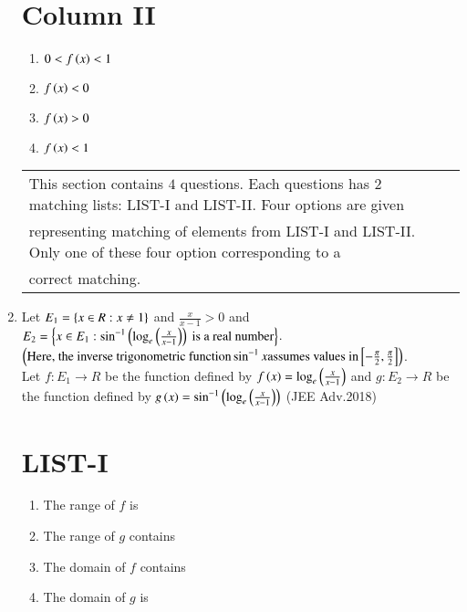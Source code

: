 \documentclass[journal,12pt,onecolumn,article]{IEEEtran}
\theoremstyle{remark}
\begin{document}
\begin{enumerate}
\begin{multicols}{2}
						\section*{ Column II}
						\begin{enumerate}[label=(\alph*) ,start=16]
							\item $0<f\left(x\right)<1$
							\item $f\left(x\right)<0$
							\item $f\left(x\right)>0$
							\item $f\left(x\right)<1$
						\end{enumerate}
					\end{multicols}
         \begin{tabular}{l|l}
\\
\hline
This section contains $4$ questions. Each questions has $2$ matching lists: LIST-I and LIST-II. Four options are given\\representing matching of elements from LIST-I and LIST-II. Only one of these four option corresponding to a\\correct matching.
\\
\hline
        \end{tabular}
			 \item Let $E_1=\left\{x\in R:x\neq1\right\}$ and $\frac{x}{x-1}>0$ and 
				 $E_2=\left\{x\in E_1:\sin^{-1}\left(\log_e\left(\frac{x}{x-1}\right)\right)\text{ is a real number}\right\}$.\\
					$ \left(\text{Here, the inverse trigonometric function} \sin^{-1}x \text{assumes values in} {}\left[-\frac{\pi}{2},\frac{\pi}{2}\right]\right)$.\\
			
			Let $f:E_1\to R$ be the function defined by $f\left(x\right)=\log_e\left(\frac{x}{x-1}\right)$ and $g:E_2\to R$ be the function defined by $g\left(x\right)=\sin^{-1}\left(\log_e\left(\frac{x}{x-1}\right)\right)$
			\hfill(JEE Adv.2018)
\begin{multicols}{2}
	\section*{LIST-I}
	\begin{enumerate}[label=(\Alph*), start=16]
	\item The range of $f$ is
	\item The range of $g$ contains
	\item The domain of $f$ contains
	\item The domain of $g$ is 
\end{enumerate}
\columnbreak

\end{multicols}
\end{enumerate}
\end{document}
